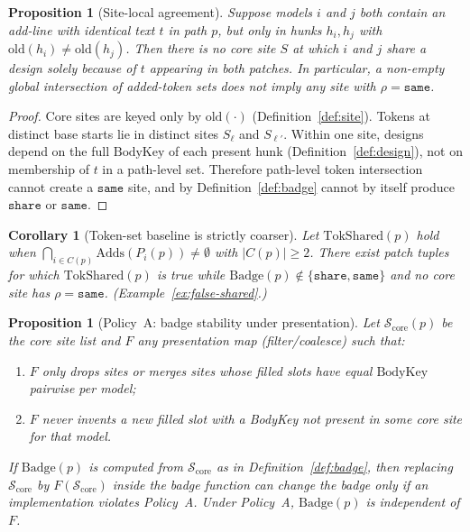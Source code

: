 \documentclass[
  11pt,
  a4paper,
  oneside,
  numbers=noenddot,
  abstract=true,
  headings=normal,
  DIV=11,
  BCOR=0mm,
]{scrartcl}
\theoremstyle{definition}
\theoremstyle{plain}
\newtheorem{proposition}[definition]{Proposition}
\newtheorem{corollary}[definition]{Corollary}
\theoremstyle{remark}
\newcommand{\badge}[1]{\texttt{#1}}
\newcommand{\BodyKey}{\mathrm{BodyKey}}
\newcommand{\Badge}{\mathrm{Badge}}
\begin{document}
\begin{proposition}[Site-local agreement]
\label{prop:local}
Suppose models $i$ and $j$ both contain an add-line with identical text
$t$ in path $p$, but only in hunks $h_i,h_j$ with
$\mathrm{old}(h_i)\neq\mathrm{old}(h_j)$. Then there is no core site $S$
at which $i$ and $j$ share a design solely because of $t$ appearing in both
patches. In particular, a non-empty global intersection of added-token sets
does not imply any site with $\rho=\texttt{same}$.
\end{proposition}

\begin{proof}
Core sites are keyed only by $\mathrm{old}(\cdot)$
(Definition~\ref{def:site}). Tokens at distinct base starts lie in distinct
sites $S_{\ell}$ and $S_{\ell'}$. Within one site, designs depend on the
full $\BodyKey$ of each present hunk (Definition~\ref{def:design}), not on
membership of $t$ in a path-level set. Therefore path-level token
intersection cannot create a $\texttt{same}$ site, and by
Definition~\ref{def:badge} cannot by itself produce $\badge{share}$ or
$\badge{same}$.
\end{proof}

\begin{corollary}[Token-set baseline is strictly coarser]
\label{cor:token}
Let $\mathrm{TokShared}(p)$ hold when
$\bigcap_{i\in C(p)}\mathrm{Adds}(P_i(p))\neq\emptyset$ with $|C(p)|\ge 2$.
There exist patch tuples for which $\mathrm{TokShared}(p)$ is true while
$\Badge(p)\notin\{\badge{share},\badge{same}\}$ and no core site has
$\rho=\texttt{same}$. (Example~\ref{ex:false-shared}.)
\end{corollary}

\begin{proposition}[Policy~A: badge stability under presentation]
\label{prop:policyA}
Let $\mathcal{S}_{\mathrm{core}}(p)$ be the core site list and
$F$ any presentation map (filter/coalesce) such that:
\begin{enumerate}
  \item $F$ only drops sites or merges sites whose filled slots have
        equal $\BodyKey$ pairwise per model;
  \item $F$ never invents a new filled slot with a BodyKey not present in
        some core site for that model.
\end{enumerate}
If $\Badge(p)$ is computed from $\mathcal{S}_{\mathrm{core}}$ as in
Definition~\ref{def:badge}, then replacing $\mathcal{S}_{\mathrm{core}}$ by
$F(\mathcal{S}_{\mathrm{core}})$ inside the badge function can change the
badge only if an implementation \emph{violates} Policy~A. Under Policy~A,
$\Badge(p)$ is independent of $F$.
\end{proposition}
\end{document}
